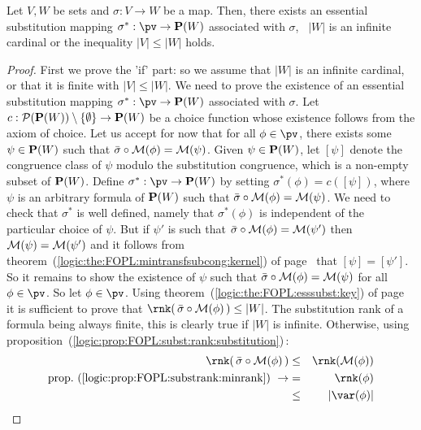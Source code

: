 \begin{theorem}\label{logic:the:FOPL:esssubst:existence}
Let $V,W$ be sets and $\sigma:V\to W$ be a map. Then, there exists
an essential substitution mapping $\sigma^{*}:\pv\to{\bf P}(W)$
associated with $\sigma$, \ifand\  $|W|$ is an infinite cardinal or
the inequality  $|V|\leq|W|$ holds.
\end{theorem}
\begin{proof}
First we prove the 'if' part: so we assume that $|W|$ is an infinite
cardinal, or that it is finite with $|V|\leq |W|$. We need to prove
the existence of an essential substitution mapping
$\sigma^{*}:\pv\to{\bf P}(W)$ associated with $\sigma$. Let $c:{\cal
P}({\bf P}(W))\setminus\{\emptyset\}\to{\bf P}(W)$ be a choice
function whose existence follows from the axiom of choice. Let us
accept for now that for all $\phi\in\pv$, there exists some
$\psi\in{\bf P}(W)$ such that $\bar{\sigma}\circ{\cal M}(\phi)={\cal
M}(\psi)$. Given $\psi\in{\bf P}(W)$, let $[\psi]$ denote the
congruence class of $\psi$ modulo the substitution congruence, which
is a non-empty subset of ${\bf P}(W)$. Define $\sigma^{*}:\pv\to{\bf
P}(W)$ by setting $\sigma^{*}(\phi)=c([\psi])$, where $\psi$ is an
arbitrary formula of ${\bf P}(W)$ such that $\bar{\sigma}\circ{\cal
M}(\phi)={\cal M}(\psi)$. We need to check that $\sigma^{*}$ is well
defined, namely that $\sigma^{*}(\phi)$ is independent of the
particular choice of $\psi$. But if $\psi'$ is such that
$\bar{\sigma}\circ{\cal M}(\phi)={\cal M}(\psi')$ then ${\cal
M}(\psi)={\cal M}(\psi')$ and it follows from
theorem~(\ref{logic:the:FOPL:mintransfsubcong:kernel}) of
page~\pageref{logic:the:FOPL:mintransfsubcong:kernel} that
$[\psi]=[\psi']$. So it remains to show the existence of $\psi$ such
that $\bar{\sigma}\circ{\cal M}(\phi)={\cal M}(\psi)$ for all
$\phi\in\pv$. So let $\phi\in\pv$. Using
theorem~(\ref{logic:the:FOPL:esssubst:key}) of
page~\pageref{logic:the:FOPL:esssubst:key} it is sufficient to prove
that $\rnk(\,\bar{\sigma}\circ{\cal M}(\phi)\,)\leq|W|$. The
substitution rank of a formula being always finite, this is clearly
true if $|W|$ is infinite. Otherwise, using
proposition~(\ref{logic:prop:FOPL:subst:rank:substitution})\,:
    \begin{eqnarray*}
    \rnk(\,\bar{\sigma}\circ{\cal M}(\phi)\,)&\leq&\rnk({\cal
    M}(\phi))\\
    \mbox{prop.~(\ref{logic:prop:FOPL:substrank:minrank})}\ \rightarrow
    &=&\rnk(\phi)\\
    &\leq&|\var(\phi)|\\

\end{eqnarray*}
\end{proof}
